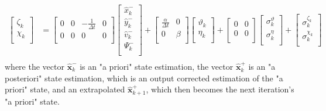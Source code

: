 \documentclass[class=article, crop=false]{standalone}
\begin{document}
\begin{align*}
    \begin{bmatrix}
     \zeta_k \\
     \chi_k  \\
    \end{bmatrix} &=
    \begin{bmatrix}
     0 & 0 & -\frac{1}{\Delta t} & 0 \\
     0 & 0 & 0                   & 0 \\
    \end{bmatrix}
    \begin{bmatrix}
     \hat{x}_{k}^- \\
     \hat{y}_{k}^- \\
     \hat{v}_{k}^- \\
     \Psi_{k}^-    \\
    \end{bmatrix} +
    \begin{bmatrix}
     \frac{\alpha}{\Delta t} & 0     \\
     0                       & \beta \\
    \end{bmatrix}
    \begin{bmatrix}
     \vartheta_k \\
     \eta_k      \\
    \end{bmatrix} +
    \begin{bmatrix}
     0 & 0 \\
     0 & 0 \\
    \end{bmatrix}
    \begin{bmatrix}
     \sigma^{\vartheta}_k \\
     \sigma^{\eta}_k      \\
    \end{bmatrix} +
    \begin{bmatrix}
     \sigma^{\zeta_k}_k \\
     \sigma^{\chi_k}_k  \\
    \end{bmatrix} \\
\end{align*}\label{eqn:fullsystem}
where the vector $\hat{\textbf{x}}_k^-$ is an "a priori" state estimation, the vector $\hat{\textbf{x}}_k^+$ is an "a posteriori" state estimation, which is an output corrected estimation of the "a priori" state, and an extrapolated $\hat{\textbf{x}}_{k+1}^+$, which then becomes the next iteration's "a priori" state.
\end{document}
